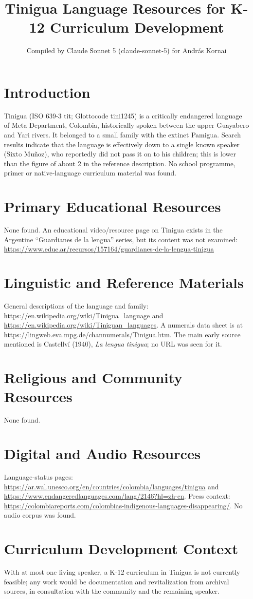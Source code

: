 \documentclass[12pt]{article}
\title{Tinigua Language Resources for K-12 Curriculum Development}
\author{Compiled by Claude Sonnet 5 (claude-sonnet-5) for Andr\'as Kornai}
\date{}
\begin{document}
\maketitle
\section{Introduction}
Tinigua (ISO 639-3 tit; Glottocode tini1245) is a critically endangered language of Meta Department, Colombia, historically spoken between the upper Guayabero and Yari rivers. It belonged to a small family with the extinct Pamigua. Search results indicate that the language is effectively down to a single known speaker (Sixto Mu\~noz), who reportedly did not pass it on to his children; this is lower than the figure of about 2 in the reference description. No school programme, primer or native-language curriculum material was found.
\section{Primary Educational Resources}
None found. An educational video/resource page on Tinigua exists in the Argentine ``Guardianes de la lengua'' series, but its content was not examined:
\url{https://www.educ.ar/recursos/157164/guardianes-de-la-lengua-tinigua}
\section{Linguistic and Reference Materials}
General descriptions of the language and family: \url{https://en.wikipedia.org/wiki/Tinigua_language} and \url{https://en.wikipedia.org/wiki/Tiniguan_languages}. A numerals data sheet is at \url{https://lingweb.eva.mpg.de/channumerals/Tinigua.htm}. The main early source mentioned is Castellv\'i (1940), \emph{La lengua tinigua}; no URL was seen for it.
\section{Religious and Community Resources}
None found.
\section{Digital and Audio Resources}
Language-status pages: \url{https://ar.wal.unesco.org/en/countries/colombia/languages/tinigua} and \url{https://www.endangeredlanguages.com/lang/2146?hl=zh-cn}. Press context: \url{https://colombiareports.com/colombias-indigenous-languages-disappearing/}. No audio corpus was found.
\section{Curriculum Development Context}
With at most one living speaker, a K-12 curriculum in Tinigua is not currently feasible; any work would be documentation and revitalization from archival sources, in consultation with the community and the remaining speaker.
\end{document}
